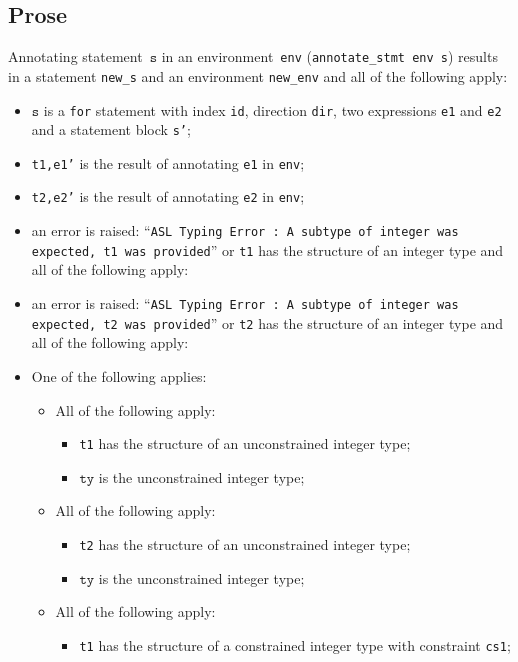 \documentclass{book}
\newcommand\vs[0]{\texttt{s}}
\newcommand\tty[0]{\texttt{ty}}
\begin{document}
\begin{itemize}
  \subsection{Prose}
Annotating statement~$\vs$ in an environment~\texttt{env}
(\texttt{annotate\_stmt env s}) results in a statement \texttt{new\_s} and an
environment \texttt{new\_env} and all of the following apply:
   \begin{itemize}
   \item $\vs$ is a \texttt{for} statement with index \texttt{id}, direction \texttt{dir}, two expressions
      \texttt{e1} and \texttt{e2} and a statement block \texttt{s'};
   \item \texttt{t1,e1'} is the result of annotating \texttt{e1} in \texttt{env};
   \item \texttt{t2,e2'} is the result of annotating \texttt{e2} in \texttt{env};
   \item an error is raised: ``\texttt{ASL Typing Error : A subtype of integer was expected, t1 was provided}'' or \texttt{t1} has the structure of an integer type and all of the following apply:
   \item an error is raised: ``\texttt{ASL Typing Error : A subtype of integer was expected, t2 was provided}'' or \texttt{t2} has the structure of an integer type and all of the following apply:
   \item One of the following applies:
     \begin{itemize}
       \item All of the following apply:
         \begin{itemize}
           \item \texttt{t1} has the structure of an unconstrained integer type;
           \item $\tty$ is the unconstrained integer type;
         \end{itemize}
       \item All of the following apply:
         \begin{itemize}
           \item \texttt{t2} has the structure of an unconstrained integer type;
           \item $\tty$ is the unconstrained integer type;
         \end{itemize}
       \item All of the following apply:
         \begin{itemize}
           \item \texttt{t1} has the structure of a constrained integer type with constraint \texttt{cs1};

\end{itemize}
\end{itemize}
\end{itemize}
\end{itemize}
\end{document}
